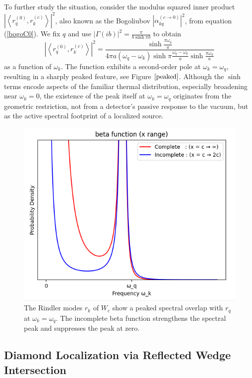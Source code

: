 \documentclass[12pt,a4paper]{article}
\begin{document}
{To further study the situation, consider the modulus squared inner product $\left|\left<r_q^{(0)}, r_k^{(c)} \right>\right|^2$, also known as the Bogoliubov $\left|\alpha^{(c \rightarrow 0)}_{kq}\right|^2$, from equation (\ref{bogoC0}).  We fix $q$ and use $|\Gamma(ib)|^2 = \frac{\pi}{b \sinh \pi b}$ to obtain
\begin{equation}
  \left|\left<r_q^{(0)}, r_k^{(c)} \right>\right|^2 = \frac{\sinh \frac{\pi \omega_q}{a}}{4\pi a (\omega_q - \omega_k) \sinh \pi \frac{\omega_q - \omega_k}{a} \sinh \frac{\pi \omega_k}{a}}
\end{equation}
as a function of $\omega_k$. The function exhibits a second-order pole at $\omega_k = \omega_q$, resulting in a sharply peaked feature, see Figure $\ref{peaked}$. Although the $\sinh$ terms encode aspects of the familiar thermal distribution, especially broadening near $\omega_k = 0$, the existence of the peak itself at $\omega_k = \omega_q$ originates from the geometric restriction, not from a detector’s passive response to the vacuum, but as the active spectral footprint of a localized source.

\begin{figure}[h]
  \centering
\includegraphics[scale=0.6]{peaked.png}
\caption{The Rindler modes $r_k$ of $W_c$ show a peaked spectral overlap with $r_q$ at $\omega_k = \omega_q$. The incomplete beta function strengthens the spectral peak and suppresses the peak at zero.}
\label{peaked}
\end{figure}

\subsection{Diamond Localization via Reflected Wedge Intersection}

}
\end{document}
